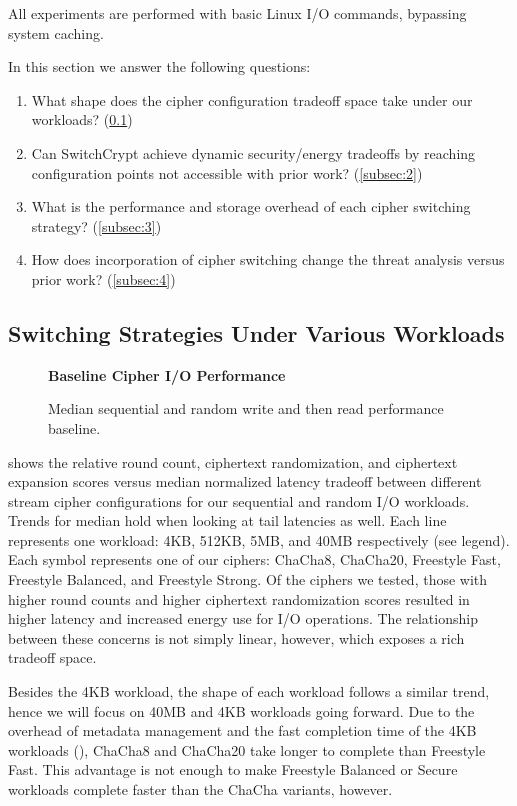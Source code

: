 All experiments are performed with basic Linux I/O commands, bypassing system
caching.

In this section we answer the following questions:

\begin{enumerate}
 \item What shape does the cipher configuration tradeoff space take under our
 workloads? (\cref{subsec:1})
 \item Can SwitchCrypt achieve dynamic security/energy tradeoffs by reaching
 configuration points not accessible with prior work? (\cref{subsec:2})
 \item What is the performance and storage overhead of each cipher switching
 strategy? (\cref{subsec:3})
 \item How does incorporation of cipher switching change the threat analysis
 versus prior work? (\cref{subsec:4})
\end{enumerate}

\subsection{Switching Strategies Under Various Workloads} \label{subsec:1}

\begin{figure}[ht]
  \textbf{Baseline Cipher I/O Performance}\par\medskip
  {} \caption{Median sequential and random
  write and then read performance baseline.}
 \label{fig:tradeoff-no-ratios}
\end{figure}

 shows the relative round count, ciphertext
randomization, and ciphertext expansion scores versus median normalized latency
tradeoff between different stream cipher configurations for our sequential and
random I/O workloads. Trends for median hold when looking at tail latencies as
well. Each line represents one workload: 4KB, 512KB, 5MB, and 40MB respectively
(see legend). Each symbol represents one of our ciphers: ChaCha8, ChaCha20,
Freestyle Fast, Freestyle Balanced, and Freestyle Strong. Of the ciphers we
tested, those with higher round counts and higher ciphertext randomization
scores resulted in higher latency and increased energy use for I/O operations.
The relationship between these concerns is not simply linear, however, which
exposes a rich tradeoff space.

Besides the 4KB workload, the shape of each workload follows a similar trend,
hence we will focus on 40MB and 4KB workloads going forward. Due to the overhead
of metadata management and the fast completion time of the 4KB workloads
(), ChaCha8 and ChaCha20 take
longer to complete than Freestyle Fast. This advantage is not enough to make
Freestyle Balanced or Secure workloads complete faster than the ChaCha variants,
however.

